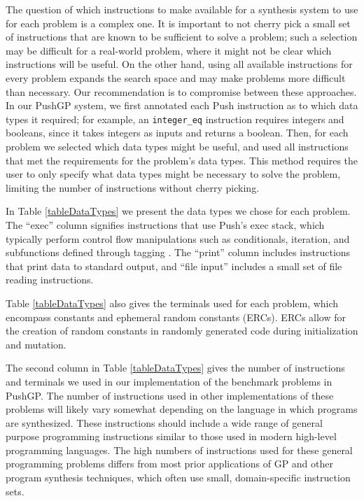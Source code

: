 \documentclass{sig-alternate}
\begin{document}

The question of which instructions to make available for a synthesis system to use for each problem is a complex one. It is important to not cherry pick a small set of instructions that are known to be sufficient to solve a problem; such a selection may be difficult for a real-world problem, where it might not be clear which instructions will be useful. On the other hand, using all available instructions for every problem expands the search space and may make problems more difficult than necessary. Our recommendation is to compromise between these approaches. In our PushGP system, we first annotated each Push instruction as to which data types it required; for example, an \texttt{integer\_eq} instruction requires integers and booleans, since it takes integers as inputs and returns a boolean. Then, for each problem we selected which data types might be useful, and used all instructions that met the requirements for the problem's data types. This method requires the user to only specify what data types might be necessary to solve the problem, limiting the number of instructions without cherry picking.

In Table \ref{tableDataTypes} we present the data types we chose for each problem. The ``exec'' column signifies instructions that use Push's exec stack, which typically perform control flow manipulations such as conditionals, iteration, and subfunctions defined through tagging \cite{Spector:2011:GECCO}. The ``print'' column includes instructions that print data to standard output, and ``file input'' includes a small set of file reading instructions.

Table \ref{tableDataTypes} also gives the terminals used for each problem, which encompass constants and ephemeral random constants (ERCs). ERCs allow for the creation of random constants in randomly generated code during initialization and mutation. 

The second column in Table \ref{tableDataTypes} gives the number of instructions and terminals we used in our implementation of the benchmark problems in PushGP. The number of instructions used in other implementations of these problems will likely vary somewhat depending on the language in which programs are synthesized. These instructions should include a wide range of general purpose programming instructions similar to those used in modern high-level programming languages. The high numbers of instructions used for these general programming problems differs from most prior applications of GP and other program synthesis techniques, which often use small, domain-specific instruction sets.
\end{document}
